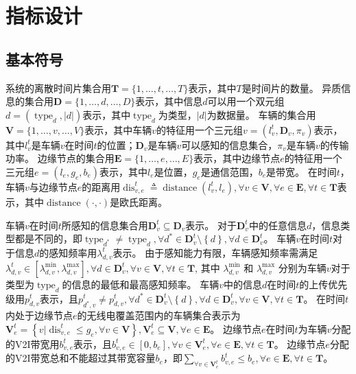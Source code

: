 \section{指标设计}\label{section 3-3}

\subsection{基本符号}

系统的离散时间片集合用$\mathbf{T}=\{1, \ldots, t, \ldots, T\}$表示，其中$T$是时间片的数量。
异质信息的集合用$\mathbf{D}=\{1, \ldots, d, \ldots, D\}$表示，其中信息$d$可以用一个双元组$d=\left(\operatorname{type}_d, \left|d\right| \right)$表示，其中$\operatorname{type}_d$为类型，$\left|d\right|$为数据量。
车辆的集合用$\mathbf{V}=\{1, \ldots, v, \ldots, V\}$表示，其中车辆$v$的特征用一个三元组$v=\left (l_v^t, \mathbf{D}_v, \pi_v \right )$表示，其中$l_v^t$是车辆$v$在时间$t$的位置；$\mathbf{D}_v$是车辆$v$可以感知的信息集合，$\pi_v$是车辆$v$的传输功率。
边缘节点的集合用$\mathbf{E}=\{1, \ldots, e, \ldots, E\}$表示，其中边缘节点$e$的特征用一个三元组$e=\left (l_e, g_e, b_e \right)$表示，其中$l_e$是位置，$g_e$是通信范围，$b_e$是带宽。
在时间$t$，车辆$v$与边缘节点$e$的距离用$\operatorname{dis}_{v,e}^t \triangleq \operatorname{distance} \left (l_v^t, l_e \right ), \forall v \in \mathbf{V}, \forall e \in \mathbf{E}, \forall t \in \mathbf{T}$表示，其中$\operatorname{distance}\left(\cdot,\cdot\right)$是欧氏距离。

车辆$v$在时间$t$所感知的信息集合用$\mathbf{D}_v^t\subseteq \mathbf{D}_v$表示。
对于$\mathbf{D}_v^t$中的任意信息$d$，信息类型都是不同的，即$\operatorname{type}_{d^*} \neq \operatorname{type}_{d}, \forall d^* \in \mathbf{D}_v^t \setminus \left\{ d\right \}, \forall d \in \mathbf{D}_v^t$。
车辆$v$在时间$t$对于信息$d$的感知频率用$\lambda_{d,v}^t$表示。
由于感知能力有限，车辆感知频率需满足$\lambda_{d,v}^{t} \in [\lambda_{d,v}^{\min} , \lambda_{d,v}^{\max} ], \forall d \in \mathbf{D}_v^t, \forall v \in \mathbf{V}, \forall t \in \mathbf{T}$, 其中 $\lambda_{d,v}^{\min}$ 和 $\lambda_{d,v}^{\max}$ 分别为车辆$v$对于类型为$\operatorname{type}_{d}$的信息的最低和最高感知频率。
车辆$v$中的信息$d$在时间$t$的上传优先级用$p_{d,v}^t$表示，且${p}_{d^*, v}^t \neq {p}_{d, v}^t, \forall d^* \in \mathbf{D}_v^t \setminus \left\{ d\right \}, \forall d \in \mathbf{D}_v^t, \forall v \in \mathbf{V}, \forall t \in \mathbf{T}$。
在时间$t$内处于边缘节点$e$的无线电覆盖范围内的车辆集合表示为$\mathbf{V}_e^t=\left \{v \vert \operatorname{dis}_{v,e}^t \leq g_e, \forall v \in \mathbf{V} \right \}, \mathbf{V}_e^t \subseteq \mathbf{V}, \forall e \in \mathbf{E}$。
边缘节点$e$在时间$t$为车辆$v$分配的V2I带宽用$b_{v, e}^t$表示，且$b_{v, e}^t \in \left [0,b_e \right], \forall v \in \mathbf{V}_e^{t}, \forall e \in \mathbf{E}, \forall t \in \mathbf{T}$。
边缘节点$e$分配的V2I带宽总和不能超过其带宽容量$b_e$，即${\sum_{\forall v \in \mathbf{V}_e^{t}}b_{v, e}^t} \leq b_e, \forall e \in \mathbf{E}, \forall t \in \mathbf{T}$。

